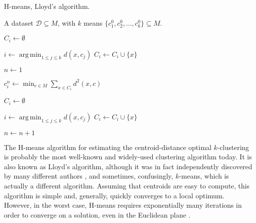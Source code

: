 \documentclass[a4paper]{report}
\DeclareMathOperator*{\argmin}{arg\,min}
\newcommand{\dset}{\mathcal{D}}
\begin{document}
\begin{algorithm}
  \caption{H-means, Lloyd's algorithm.}
  \label{alg:lloyds}
  
  \begin{algorithmic}
    \Require A dataset $\dset \subseteq M$, with $k$ means
    $\{c^0_1,c^0_2,\dotsc,c^0_k\} \subseteq M$.

       \State $C_i \gets \emptyset$
    \EndFor

    \ForAll{$x \in \dset$}
       \State $i \gets \argmin_{1 \leq j \leq k} d(x,c_j)$
       \State $C_i \gets C_i \cup \{x\}$
    \EndFor

    \State $n \gets 1$

    \Repeat
       
          \State $c^n_i \gets \min_{c \in M} \sum_{x \in C_i} d^2(x,c)$
       \EndFor

          \State $C_i \gets \emptyset$
       \EndFor
       
       \ForAll{$x \in \dset$}
          \State $i \gets \argmin_{1 \leq j \leq k} d(x,c_j)$
          \State $C_i \gets C_i \cup \{x\}$
       \EndFor

       \State $n \gets n+1$
       

          
       \State {}
  \end{algorithmic}
\end{algorithm}

The H-means algorithm for estimating the centroid-distance optimal
$k$-clustering is probably the most well-known and widely-used clustering
algorithm today.  It is also known as Lloyd's algorithm, although it was in
fact independently discovered by many different authors \citep{jain2010data},
and sometimes, confusingly, $k$-means, which is actually a different
algorithm.  Assuming that centroids are easy to compute, this algorithm is
simple and, generally, quickly converges to a local optimum.  However, in the
worst case, H-means requires exponentially many iterations in order to
converge on a solution, even in the Euclidean plane
\citep{vattani2009exponential}.
\end{document}
